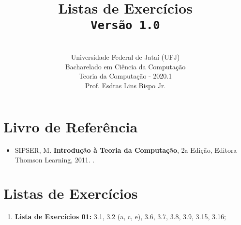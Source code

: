 \documentclass[12pt,a4paper,oneside]{article}
\author{\\Universidade Federal de Jataí (UFJ)\\Bacharelado em Ciência da Computação \\Teoria da Computação - 2020.1 \\Prof. Esdras Lins Bispo Jr.}
\date{}
\title{
	\sc \huge Listas de Exercícios
	\\{\tt Versão 1.0}
}
\begin{document}
\maketitle

\section{Livro de Referência}
	\begin{itemize}
		\item SIPSER, M. {\bf Introdução à Teoria da Computação}, 2a Edição, Editora Thomson Learning, 2011. \color{blue}{\bf Código Bib.: [004 SIP/int]}.
	\end{itemize}
	
\section{Listas de Exercícios}

\begin{enumerate}

	\subsection{Módulo 1}
	\item[] {\bf Lista de Exercícios 01:} 3.1, 3.2 (a, c, e), 3.6, 3.7, 3.8, 3.9, 3.15, 3.16;
	
	
\end{enumerate}
\end{document}
